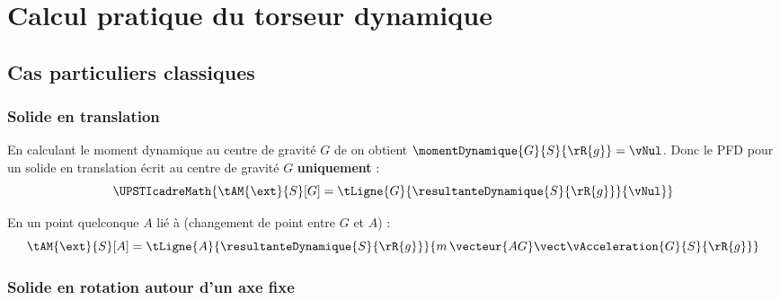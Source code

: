 \documentclass[11pt]{article}
\begin{document}

\section{Calcul pratique du torseur dynamique}

\subsection{Cas particuliers classiques}

\subsubsection{Solide en translation}

En calculant le moment dynamique au centre de gravité $G$ de  on obtient $\momentDynamique{G}{S}{\rR{g}}=\vNul$. Donc le PFD pour un solide en translation écrit au centre de gravité $G$ \textbf{uniquement} : 
\[ \UPSTIcadreMath{\tAM{\ext}{S}[G]=\tLigne{G}{\resultanteDynamique{S}{\rR{g}}}{\vNul}} \] 
 
En un point quelconque $A$ lié à  (changement de point entre $G$ et $A$) :
\[ \tAM{\ext}{S}[A]=\tLigne{A}{\resultanteDynamique{S}{\rR{g}}}{m\,\vecteur{AG}\vect\vAcceleration{G}{S}{\rR{g}}}\] 

\vspace{1em}
\subsubsection{Solide en rotation autour d'un axe fixe \texorpdfstring{}{(O,z)}}
\end{document}
